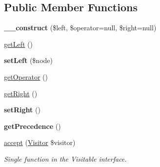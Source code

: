 \subsection*{Public Member Functions}
\begin{DoxyCompactItemize}
\item 
\hypertarget{classMathParser_1_1Parsing_1_1Nodes_1_1ExpressionNode_ad225055b7e075eabc33c0f7bfd4253cb}{{\bfseries \-\_\-\-\_\-construct} (\$left, \$operator=null, \$right=null)}\label{classMathParser_1_1Parsing_1_1Nodes_1_1ExpressionNode_ad225055b7e075eabc33c0f7bfd4253cb}

\item 
\hyperlink{classMathParser_1_1Parsing_1_1Nodes_1_1ExpressionNode_a8e50a23c59679015c5e45b723d7bcb7d}{get\-Left} ()
\item 
\hypertarget{classMathParser_1_1Parsing_1_1Nodes_1_1ExpressionNode_ac80c6f5b4094d659e1ac5fb20e81aa82}{{\bfseries set\-Left} (\$node)}\label{classMathParser_1_1Parsing_1_1Nodes_1_1ExpressionNode_ac80c6f5b4094d659e1ac5fb20e81aa82}

\item 
\hyperlink{classMathParser_1_1Parsing_1_1Nodes_1_1ExpressionNode_afeb588203d9912983be68c68aaad8a87}{get\-Operator} ()
\item 
\hyperlink{classMathParser_1_1Parsing_1_1Nodes_1_1ExpressionNode_af0a80f6914435eee930199efb29579dd}{get\-Right} ()
\item 
\hypertarget{classMathParser_1_1Parsing_1_1Nodes_1_1ExpressionNode_a59bc32c91eb22d0ba11be9ed63ed3c0f}{{\bfseries set\-Right} ()}\label{classMathParser_1_1Parsing_1_1Nodes_1_1ExpressionNode_a59bc32c91eb22d0ba11be9ed63ed3c0f}

\item 
\hypertarget{classMathParser_1_1Parsing_1_1Nodes_1_1ExpressionNode_a4b2cecccf464f7941fe87f66fd3dd9f1}{{\bfseries get\-Precedence} ()}\label{classMathParser_1_1Parsing_1_1Nodes_1_1ExpressionNode_a4b2cecccf464f7941fe87f66fd3dd9f1}

\item 
\hyperlink{classMathParser_1_1Parsing_1_1Nodes_1_1ExpressionNode_a3794b9185ed7928df1f39ec42c557106}{accept} (\hyperlink{interfaceMathParser_1_1Interpreting_1_1Visitors_1_1Visitor}{Visitor} \$visitor)
\begin{DoxyCompactList}\small\item\em Single function in the Visitable interface. \end{DoxyCompactList}\end{DoxyCompactItemize}
